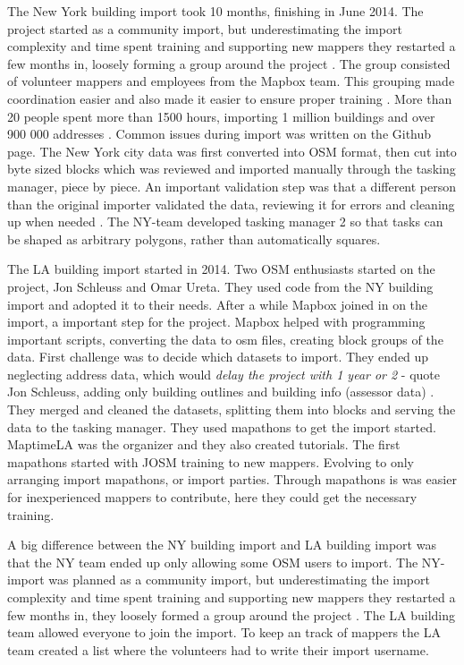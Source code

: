 The New York building import took 10 months, finishing in June 2014. The project started as a community import, but underestimating the import complexity and time spent training and supporting new mappers they restarted a few months in, loosely forming a group around the project \cite{Barth2014}. The group consisted of volunteer mappers and employees from the Mapbox team. This grouping made coordination easier and also made it easier to ensure proper training \cite{Barth2014a}. More than 20 people spent more than 1500 hours, importing 1 million buildings and over 900 000 addresses \cite{Barth2014}. Common issues during import was written on the Github page. The New York city data was first converted into OSM format, then cut into byte sized blocks which was reviewed and imported manually through the tasking manager, piece by piece. An important validation step was that a different person than the original importer validated the data, reviewing it for errors and cleaning up when needed \cite{Barth2014}. The NY-team developed tasking manager 2 so that tasks can be shaped as arbitrary polygons, rather than automatically squares.  

The LA building import started in 2014. Two OSM enthusiasts started on the project, Jon Schleuss and Omar Ureta. They used code from the NY building import and adopted it to their needs. After a while Mapbox joined in on the import, a important step for the project. Mapbox helped with programming important scripts, converting the data to osm files, creating block groups of the data. First challenge was to decide which datasets to import.  They ended up neglecting address data, which would \textit{delay the project with 1 year or 2} - quote Jon Schleuss, adding only building outlines and building info (assessor data) \cite{Schleuss2016}. They merged and cleaned the datasets, splitting them into blocks and serving the data to the tasking manager. They used mapathons to get the import  started. MaptimeLA was the organizer and they also created tutorials. The first mapathons started with JOSM training to new mappers. Evolving to only arranging import mapathons, or import parties. Through mapathons is was easier for inexperienced mappers to contribute, here they could get the necessary training.  %

A big difference between the NY building import and LA building import was that the NY team ended up only allowing some OSM users to import. The NY-import was planned as a community import, but underestimating the import complexity and time spent training and supporting new mappers they restarted a few months in,  they loosely formed a group around the project \cite{Barth2014}. The LA building team allowed everyone to join the import. To keep an track of mappers the LA team created a list where the volunteers had to write their import username.  %

